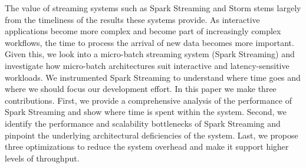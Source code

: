 The value of streaming systems such as Spark Streaming and Storm stems largely from the timeliness of the results these systems provide.
As interactive applications become more complex and become part of increasingly complex workflows, the time to process the arrival of new data becomes more important.
Given this, we look into a micro-batch streaming system (Spark Streaming) and investigate how micro-batch architectures suit interactive and latency-sensitive workloads. 
We instrumented Spark Streaming to understand where time goes and where we should focus our development effort. 
In this paper we make three contributions. 
First, we provide a comprehensive analysis of the performance of Spark Streaming and show where time is spent within the system. 
Second, we identify the performance and scalability bottlenecks of Spark Streaming and pinpoint the underlying architectural deficiencies of the system. 
Last, we propose three optimizations to reduce the system overhead and make it support higher levels of throughput.
        

